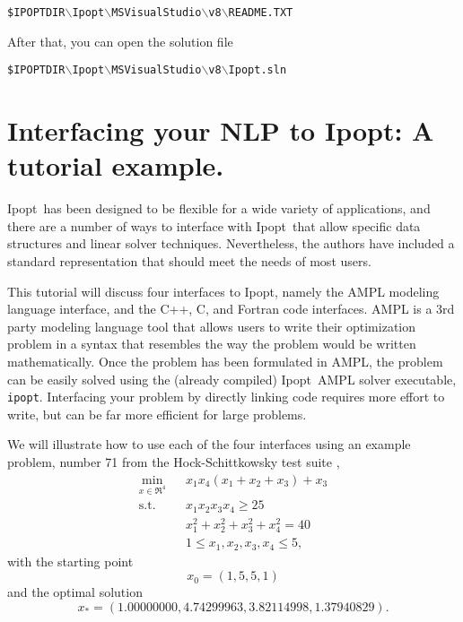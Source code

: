 \documentclass[10pt]{article}
\newcommand{\Ipopt}{{\sc Ipopt}}
\begin{document}
\texttt{\$IPOPTDIR$\backslash$Ipopt$\backslash$MSVisualStudio$\backslash$v8$\backslash$README.TXT}

After that, you can open the solution file

\texttt{\$IPOPTDIR$\backslash$Ipopt$\backslash$MSVisualStudio$\backslash$v8$\backslash$Ipopt.sln}

\section{Interfacing your NLP to \Ipopt: A tutorial example.}
\label{sec:tutorial-example}

\Ipopt\ has been designed to be flexible for a wide variety of
applications, and there are a number of ways to interface with \Ipopt\
that allow specific data structures and linear solver
techniques. Nevertheless, the authors have included a standard
representation that should meet the needs of most users.

This tutorial will discuss four interfaces to \Ipopt, namely the AMPL
modeling language\cite{FouGayKer:AMPLbook} interface, and the C++, C,
and Fortran code interfaces.  AMPL is a 3rd party modeling language
tool that allows users to write their optimization problem in a syntax
that resembles the way the problem would be written mathematically.
Once the problem has been formulated in AMPL, the problem can be
easily solved using the (already compiled) \Ipopt\ AMPL solver
executable, {\tt ipopt}. Interfacing your problem by directly linking
code requires more effort to write, but can be far more efficient for
large problems.

We will illustrate how to use each of the four interfaces using an
example problem, number 71 from the Hock-Schittkowsky test suite \cite{HS},
  \begin{eqnarray}
    \min_{x \in \Re^4} &&x_1 x_4 (x_1 + x_2 + x_3)  +  x_3 \label{eq:ex_obj} \\
    \mbox{s.t.}  &&x_1 x_2 x_3 x_4 \ge 25 \label{eq:ex_ineq} \\
    &&x_1^2 + x_2^2 + x_3^2 + x_4^2  =  40 \label{eq:ex_equ} \\
    &&1 \leq x_1, x_2, x_3, x_4 \leq 5, \label{eq:ex_bounds}
  \end{eqnarray}
with the starting point
\begin{equation}
x_0 = (1, 5, 5, 1) \label{eq:ex_startpt}
\end{equation}
and the optimal solution
\[
x_* = (1.00000000, 4.74299963, 3.82114998, 1.37940829). \nonumber
\]
\end{document}
